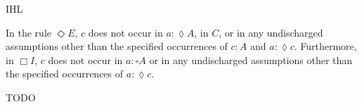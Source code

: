 \begin{entry}{IHL}
\begin{clarifications}
In the rule $\Diamond E$, $c$ does not occur in $a: \lozenge A $, in
$C$, or in any undischarged assumptions other than the specified
occurrences of $c: A$ and $a: \lozenge c $.  Furthermore, in $\Box I$,
$c$ does not occur in $a:\square A $ or in any undischarged
assumptions other than the specified occurrences of $a: \lozenge c$.
\end{clarifications}

\begin{history}
TODO
\end{history}


\end{entry}
